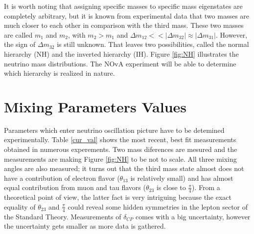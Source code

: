 It is worth noting that assigning specific masses to specific mass eigenstates are completely 
arbitrary, but it is known from experimental data that two masses are much closer to each other 
in comparison with the third mass. These two masses are called $m_1$ and $m_2$, with $m_2 > m_1$ 
and $\Delta m_{12} << |\Delta m_{32}| \approx |\Delta m_{31}|$. However, the sign of $\Delta m_{32}$ 
is still unknown. That leaves two possibilities, called the normal hierarchy (NH) and the inverted 
hierarchy (IH). Figure \ref{fig:NH} illustrates the neutrino mass distributions. The NOvA experiment 
will be able to determine which hierarchy is realized in nature.

\section{Mixing Parameters Values} \label{osc_param}
Parameters which enter neutrino oscillation picture have to be detemined experimentally. Table \ref{cur_val}
shows the most recent, best fit measurements obtained in numerous experements. Two mass diferences are 
mesured and the measurements are making Figure \ref{fig:NH} to be not to scale. All three mixing angles
are also measured; it turns out that the third mass state almost does not have a contribution of electron 
flavor ($\theta_{13}$ is relatively small) and has almost equal contribution from muon and tau flavors
($\theta_{23}$ is close to $\frac{\pi}{4}$). From a theoretical point of view, the latter fact is very 
intriguing because the exact equality of $\theta_{23}$ and $\frac{\pi}{4}$ could reveal some hidden symmetries 
in the lepton sector of the Standard Theory. Measurements of $\delta_{CP}$ comes with a big uncertainty, 
however the uncertainty gets smaller as more data is gathered.
